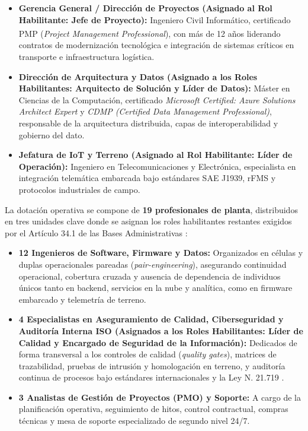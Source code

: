 \begin{itemize}
    \item \textbf{Gerencia General / Dirección de Proyectos (Asignado al Rol Habilitante: Jefe de Proyecto):} Ingeniero Civil Informático, certificado PMP\textsuperscript{\textregistered} (\emph{Project Management Professional}), con más de 12 años liderando contratos de modernización tecnológica e integración de sistemas críticos en transporte e infraestructura logística.
    \item \textbf{Dirección de Arquitectura y Datos (Asignado a los Roles Habilitantes: Arquitecto de Solución y Líder de Datos):} Máster en Ciencias de la Computación, certificado \emph{Microsoft Certified: Azure Solutions Architect Expert} y \emph{CDMP (Certified Data Management Professional)}, responsable de la arquitectura distribuida, capas de interoperabilidad y gobierno del dato.
    \item \textbf{Jefatura de IoT y Terreno (Asignado al Rol Habilitante: Líder de Operación):} Ingeniero en Telecomunicaciones y Electrónica, especialista en integración telemática embarcada bajo estándares SAE J1939, rFMS y protocolos industriales de campo.
\end{itemize}

La dotación operativa se compone de \textbf{19 profesionales de planta}, distribuidos en tres unidades clave donde se asignan los roles habilitantes restantes exigidos por el Artículo 34.1 de las Bases Administrativas \parencite{bases_admin_2026}:

\begin{itemize}
    \item \textbf{12 Ingenieros de Software, Firmware y Datos:} Organizados en células y duplas operacionales pareadas (\emph{pair-engineering}), asegurando continuidad operacional, cobertura cruzada y ausencia de dependencia de individuos únicos tanto en backend, servicios en la nube y analítica, como en firmware embarcado y telemetría de terreno.
    \item \textbf{4 Especialistas en Aseguramiento de Calidad, Ciberseguridad y Auditoría Interna ISO (Asignados a los Roles Habilitantes: Líder de Calidad y Encargado de Seguridad de la Información):} Dedicados de forma transversal a los controles de calidad (\emph{quality gates}), matrices de trazabilidad, pruebas de intrusión y homologación en terreno, y auditoría continua de procesos bajo estándares internacionales y la Ley N.\textordmasculine{} 21.719 \parencite{ley21719}.
    \item \textbf{3 Analistas de Gestión de Proyectos (PMO) y Soporte:} A cargo de la planificación operativa, seguimiento de hitos, control contractual, compras técnicas y mesa de soporte especializado de segundo nivel 24/7.
\end{itemize}


